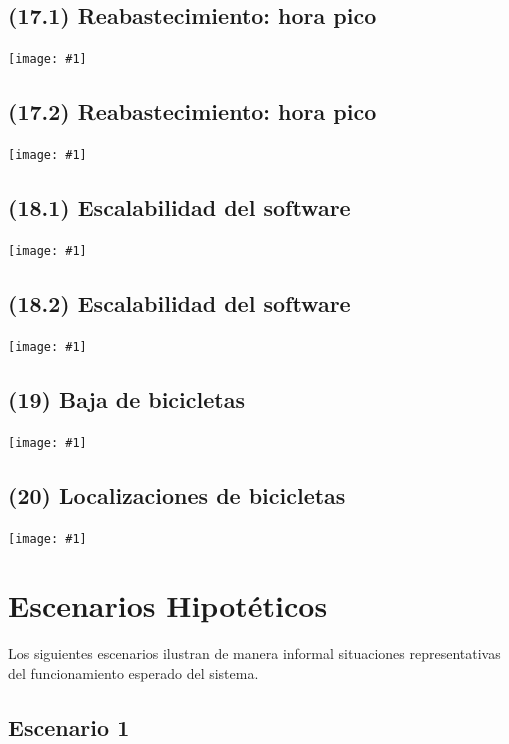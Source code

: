 \documentclass[a4paper, 10pt, twoside]{article}
\newcommand{\diagrama}[1]{
  \texttt{[image: \#1]}
}
\begin{document}
\subsection{(17.1) Reabastecimiento: hora pico}
\diagrama{objetivos-17.1}

\subsection{(17.2) Reabastecimiento: hora pico}
\diagrama{objetivos-17.2}

\subsection{(18.1) Escalabilidad del software}
\diagrama{objetivos-18.1}

\subsection{(18.2) Escalabilidad del software}
\diagrama{objetivos-18.2}

\subsection{(19)   Baja de bicicletas}
\diagrama{objetivos-19}

\subsection{(20)   Localizaciones de bicicletas}
\diagrama{objetivos-20}




\section{Escenarios Hipotéticos}


Los siguientes escenarios ilustran de manera informal situaciones representativas del funcionamiento esperado del sistema.


\subsection{Escenario 1}
\end{document}
